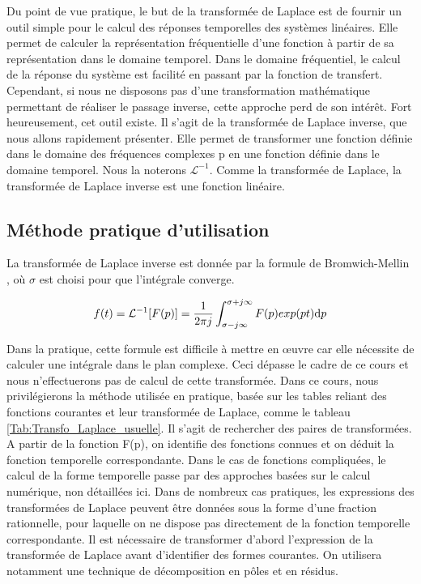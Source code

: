 	
	Du point de vue pratique, le but de la transformée de Laplace est de fournir un outil simple pour le calcul des réponses temporelles des systèmes linéaires. Elle permet de calculer la représentation fréquentielle d'une fonction à partir de sa représentation dans le domaine temporel. Dans le domaine fréquentiel, le calcul de la réponse du système est facilité en passant par la fonction de transfert. Cependant, si nous ne disposons pas d'une transformation mathématique permettant de réaliser le passage inverse, cette approche perd de son intérêt.  Fort heureusement, cet outil existe. Il s'agit de la transformée de Laplace inverse, que nous allons rapidement présenter. 
	 Elle permet de transformer une fonction définie dans le domaine des fréquences complexes p en une fonction définie dans le domaine temporel. Nous la noterons $\mathcal{L}^{-1}$. Comme la transformée de Laplace, la transformée de Laplace inverse est une fonction linéaire.
	
	
	\subsection{Méthode pratique d'utilisation}
	
	La transformée de Laplace inverse est donnée par la formule de Bromwich-Mellin , où $\sigma$ est choisi pour que l'intégrale converge.
	
	\begin{equation}\label{TL_inverse}
	f(t) = \mathcal{L}^{-1}[F(p)]=\frac{1}{2\pi j}\int_{\sigma - j\infty}^{\sigma + j\infty}F(p)exp(pt) \mathrm{d} p
	\end{equation}
	
	Dans la pratique, cette formule est difficile à mettre en œuvre car elle nécessite de calculer une intégrale dans le plan complexe. Ceci dépasse le cadre de ce cours et nous n'effectuerons pas de calcul de cette transformée. Dans ce cours, nous privilégierons la méthode utilisée en pratique, basée sur les tables reliant des fonctions courantes et leur transformée de Laplace, comme le tableau \ref{Tab:Transfo_Laplace_usuelle}. Il s'agit de rechercher des paires de transformées. A partir de la fonction F(p), on identifie des fonctions connues et on déduit la fonction temporelle correspondante. Dans le cas de fonctions compliquées, le calcul de la forme temporelle passe par des approches basées sur le calcul numérique, non détaillées ici. Dans de nombreux cas pratiques, les expressions des transformées de Laplace peuvent être données sous la forme d'une fraction rationnelle, pour laquelle on ne dispose pas directement de la fonction temporelle correspondante. Il est nécessaire de transformer d'abord l'expression de la transformée de Laplace avant d'identifier des formes courantes. On utilisera notamment une technique de décomposition en pôles et en résidus.
	 
